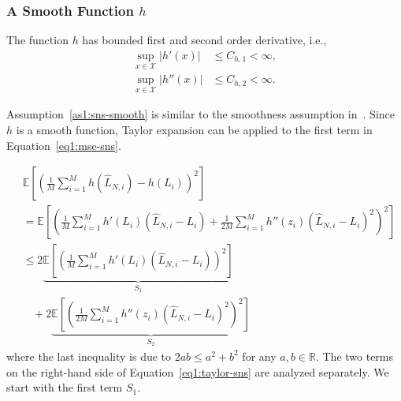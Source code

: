 \subsubsection*{A Smooth Function $h$}
\begin{assumption} \label{as1:sns-smooth}
    The function $h$ has bounded first and second order derivative, i.e.,
    \begin{align*}
        \sup_{x \in \mathcal{X}} |h'(x)|  & \leq C_{h, 1} < \infty, \\
        \sup_{x \in \mathcal{X}} |h''(x)| & \leq C_{h, 2} < \infty.
    \end{align*}
\end{assumption}
Assumption~\ref{as1:sns-smooth} is similar to the smoothness assumption in~\cite{wang2022smooth}.
Since $h$ is a smooth function, Taylor expansion can be applied to the first term in Equation~\ref{eq1:mse-sns}.

\begin{align} \label{eq1:taylor-sns}
    & \mathbb{E} \left[  \left( \frac{1}{M} \sum_{i=1}^M h\left( \hat{L}_{N, i} \right) -  h\left(L_i \right)  \right)^2\right] \nonumber \\
    & = \mathbb{E} \left[ \left( \frac{1}{M} \sum_{i=1}^M h'\left( L_i \right) \left( \hat{L}_{N, i} - L_i \right) +  \frac{1}{2M} \sum_{i=1}^M h''\left( z_i \right) \left( \hat{L}_{N, i} - L_i \right)^2 \right)^2\right] \nonumber \\
    & \leq 2 \underbrace{\mathbb{E} \left[ \left( \frac{1}{M} \sum_{i=1}^M h'\left( L_i \right) \left( \hat{L}_{N, i}- L_i \right) \right)^2\right]}_{S_1} \nonumber \\
    & ~~~~ + 2 \underbrace{\mathbb{E} \left[ \left( \frac{1}{2M} \sum_{i=1}^M h''\left( z_i \right) \left( \hat{L}_{N, i} - L_i \right)^2 \right)^2\right]}_{S_2}
\end{align}
where the last inequality is due to $2ab \leq a^2 + b^2$ for any $a, b \in \mathbb{R}$. 
The two terms on the right-hand side of Equation~\ref{eq1:taylor-sns} are analyzed separately.
We start with the first term $S_1$.

